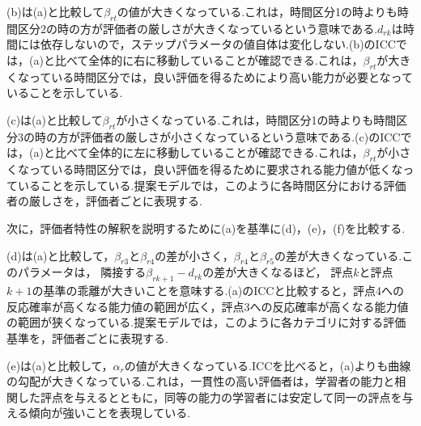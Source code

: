 \documentclass[a4paper，11pt，oneside，openany]{jsbook}
\begin{document}
(b)は(a)と比較して$\beta_{rt}$の値が大きくなっている.これは，時間区分1の時よりも時間区分2の時の方が評価者の厳しさが大きくなっているという意味である.$d_{rk}$は時間には依存しないので，ステップパラメータの値自体は変化しない.(b)のICCでは，(a)と比べて全体的に右に移動していることが確認できる.これは，$\beta_{rt}$が大きくなっている時間区分では，良い評価を得るためにより高い能力が必要となっていることを示している.

(c)は(a)と比較して$\beta_{rt}$が小さくなっている.これは，時間区分1の時よりも時間区分3の時の方が評価者の厳しさが小さくなっているという意味である.(c)のICCでは，(a)と比べて全体的に左に移動していることが確認できる.これは，$\beta_{rt}$が小さくなっている時間区分では，良い評価を得るために要求される能力値が低くなっていることを示している.提案モデルでは，このように各時間区分における評価者の厳しさを，評価者ごとに表現する.

次に，評価者特性の解釈を説明するために(a)を基準に(d)，(e)，(f)を比較する.

(d)は(a)と比較して，$\beta_{r3}$と$\beta_{r4}$の差が小さく，$\beta_{r4}$と$\beta_{r5}$の差が大きくなっている.このパラメータは， 隣接する$\beta_{rk+1} − d_{rk}$の差が大きくなるほど， 評点$k$と評点$k+1$の基準の乖離が大きいことを意味する.(a)のICCと比較すると，評点4への反応確率が高くなる能力値の範囲が広く，評点3への反応確率が高くなる能力値の範囲が狭くなっている.提案モデルでは，このように各カテゴリに対する評価基準を，評価者ごとに表現する.

(e)は(a)と比較して，$\alpha_r$の値が大きくなっている.ICCを比べると，(a)よりも曲線の勾配が大きくなっている.これは，一貫性の高い評価者は，学習者の能力と相関した評点を与えるとともに，同等の能力の学習者には安定して同一の評点を与える傾向が強いことを表現している.
\end{document}
